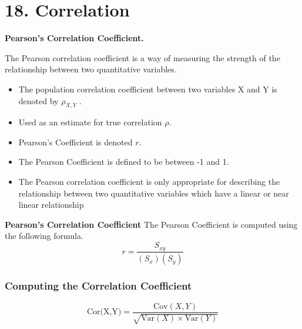 \documentclass[]{report}
\begin{document}

	\chapter{18. Correlation}
	
	
	
	\noindent \textbf{Pearson's Correlation Coefficient.}
	
	The Pearson correlation coefficient is a way of measuring the
	strength of the relationship between two quantitative variables.
	
	\begin{itemize}
		\item The population correlation coefficient between two variables X and
		Y is denoted by $\rho_{X,Y}$ .
		\item Used as an estimate for true correlation $\rho$.
		\item Pearson's Coefficient is denoted $r$.
		\item The Pearson Coefficient is defined to be between -1 and 1.
		\item The Pearson correlation coefficient is only appropriate for
		describing the relationship between two quantitative variables
		which have a linear or near linear relationship
	\end{itemize}
	
	\noindent \textbf{Pearson's Correlation Coefficient}
	The Pearson Coefficient is computed using the following formula.
	\[ r = \frac{S_{xy}}{(S_x)(S_y)} \]
	
	

	
	

		\subsection{Computing the Correlation Coefficient}
		
		\[ \mbox{Cor(X,Y)} = \frac{\mbox{Cov}(X,Y)}{\sqrt{\mbox{Var}(X) \times \mbox{Var}(Y)}} \]
		
		
\end{document}
